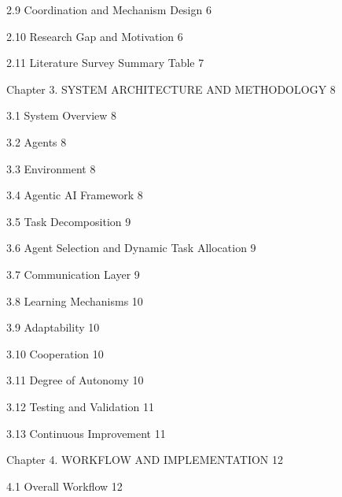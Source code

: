 \documentclass[12pt,letterpaper]{article}
\begin{document}
\noindent\hspace*{28pt} 2.9 Coordination and Mechanism Design \hfill 6\par
\noindent\hspace*{28pt} 2.10 Research Gap and Motivation \hfill 6\par
\noindent\hspace*{28pt} 2.11 Literature Survey Summary Table \hfill 7\par
\noindent Chapter 3. SYSTEM ARCHITECTURE AND METHODOLOGY \hfill 8\par
\noindent\hspace*{28pt} 3.1 System Overview \hfill 8\par
\noindent\hspace*{28pt} 3.2 Agents \hfill 8\par
\noindent\hspace*{28pt} 3.3 Environment \hfill 8\par
\noindent\hspace*{28pt} 3.4 Agentic AI Framework \hfill 8\par
\noindent\hspace*{28pt} 3.5 Task Decomposition \hfill 9\par
\noindent\hspace*{28pt} 3.6 Agent Selection and Dynamic Task Allocation \hfill 9\par
\noindent\hspace*{28pt} 3.7 Communication Layer \hfill 9\par
\noindent\hspace*{28pt} 3.8 Learning Mechanisms \hfill 10\par
\noindent\hspace*{28pt} 3.9 Adaptability \hfill 10\par
\noindent\hspace*{28pt} 3.10 Cooperation \hfill 10\par
\noindent\hspace*{28pt} 3.11 Degree of Autonomy \hfill 10\par
\noindent\hspace*{28pt} 3.12 Testing and Validation \hfill 11\par
\noindent\hspace*{28pt} 3.13 Continuous Improvement \hfill 11\par
\noindent Chapter 4. WORKFLOW AND IMPLEMENTATION \hfill 12\par
\noindent\hspace*{28pt} 4.1 Overall Workflow \hfill 12\par
\end{document}
